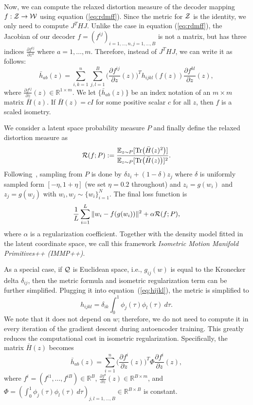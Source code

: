 Now, we can compute the relaxed distortion measure of the decoder mapping $f:{\cal Z} \to {\cal W}$ using equation (\ref{eq:rdmff}). 
Since the metric for ${\cal Z}$ is the identity, we only need to compute $J^T H J$. 
Unlike the case in equation (\ref{eq:rdmff}), the Jacobian of our decoder $f=(f^{ij})_{i=1,\ldots,n,j=1,\ldots,B}$ is not a matrix, but has three indices $\frac{\partial f^{ij}}{\partial z^a}$ where $a=1,\ldots,m$. Therefore, instead of $J^T H J$, we can write it as follows:
\begin{equation}
    \bar{h}_{ab}(z) = \sum_{i,k=1}^{n} \sum_{j,l=1}^{B} \big(\frac{\partial f^{ij}}{\partial z}(z)\big)^T h_{ijkl}(f(z)) \frac{\partial f^{kl}}{\partial z}(z),  
\end{equation}
where $\frac{\partial f^{ij}}{\partial z} (z)\in \mathbb{R}^{1 \times m}$. We let $\{\bar{h}_{ab}(z)\}$ be an index notation of an $m \times m$ matrix $\bar{H}(z)$.
If $\bar{H}(z) = cI$ for some positive scalar $c$ for all $z$, then $f$ is a scaled isometry. 

We consider a latent space probability measure $P$ and finally define the relaxed distortion measure as 
\begin{equation}
    {\cal R}(f; P):=\frac{\mathbb{E}_{z \sim P} [{\rm Tr} \big(\bar{H}(z)^2\big)]}{\mathbb{E}_{z\sim P}[{\rm Tr}\big(\bar{H}(z)\big)]^2}.
\end{equation}
Following~\cite{yonghyeon2022regularized}, sampling from $P$ is done by $\delta z_i + (1-\delta) z_j$ where $\delta$ is uniformly sampled form $[-\eta, 1+\eta]$ (we set $\eta=0.2$ throughout) and $z_i = g(w_i)$ and $z_j = g(w_j)$ with $w_i,w_j \sim \{w_i\}_{i=1}^{N}$. The final loss function is 
\begin{equation}
     \frac{1}{L} \sum_{i=1}^{L} \|w_i - f(g(w_i))\|^2 + \alpha {\cal R}(f; P),
\end{equation}
where $\alpha$ is a regularization coefficient. 
Together with the density model fitted in the latent coordinate space, we call this framework {\it Isometric Motion Manifold Primitives++ (IMMP++)}. 

As a special case, if ${\cal Q}$ is Euclidean space, i.e., $g_{ij}(w)$ is equal to the Kronecker delta $\delta_{ij}$, then the metric formula and isometric regularization term can be further simplified. Plugging it into equation~(\ref{eq:hijkl}), the metric is simplified to 
\begin{equation}
    h_{ijkl} = \delta_{ik}\int_{0}^{1} \phi_j(\tau) \phi_l(\tau) \ d\tau.
\end{equation}
We note that it does not depend on $w$; therefore, we do not need to compute it in every iteration of the gradient descent during autoencoder training. This greatly reduces the computational cost in isometric regularization. Specifically, the matrix $\bar{H}(z)$ becomes
\begin{equation}
    \bar{h}_{ab}(z) = \sum_{i=1}^{n} \big(\frac{\partial f^{i}}{\partial z}(z)\big)^T \Phi \frac{\partial f^{i}}{\partial z}(z),  
\end{equation}
where $f^{i}=(f^{i1}, \ldots, f^{iB}) \in \mathbb{R}^{B}$, $\frac{\partial f^{i}}{\partial z}(z) \in \mathbb{R}^{B \times m}$, and $\Phi=(\int_{0}^{1}\phi_j(\tau) \phi_l(\tau) \ d\tau)_{j,l=1,\ldots,B} \in \mathbb{R}^{B \times B}$ is constant.